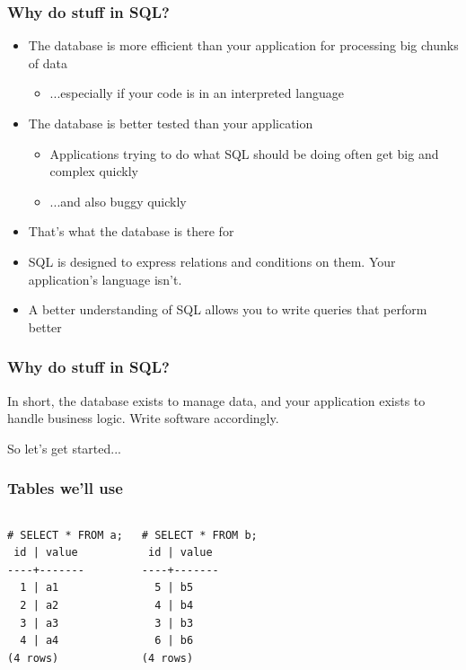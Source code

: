 \documentclass{beamer}
\begin{document}
\begin{frame}
    \frametitle{Why do stuff in SQL?}
    \begin{itemize}
        \item The database is more efficient than your application for processing big chunks of data
        \pause
        \begin{itemize}
            \item ...especially if your code is in an interpreted language
            \pause
        \end{itemize}
        \item The database is better tested than your application
        \pause
        \begin{itemize}
            \item Applications trying to do what SQL should be doing often get big and complex quickly
            \pause
            \item ...and also buggy quickly 
            \pause
        \end{itemize}
        \item That's what the database is there for
        \pause
        \item SQL is designed to express relations and conditions on them. Your application's language isn't.
        \pause
        \item A better understanding of SQL allows you to write queries that perform better
    \end{itemize}
\end{frame}

\begin{frame}
    \frametitle{Why do stuff in SQL?}
    In short, the database exists to manage data, and your application exists to handle business logic. Write software accordingly.
\end{frame}

\begin{frame}
    So let's get started...
\end{frame}

\begin{frame}[fragile]
    \frametitle{Tables we'll use}

   \begin{columns}[l]
       \column{1.5in}
       \begin{verbatim}
# SELECT * FROM a;
 id | value
----+-------
  1 | a1
  2 | a2
  3 | a3
  4 | a4
(4 rows)
       \end{verbatim}
       \column{1.5in}
       \begin{verbatim}
# SELECT * FROM b;
 id | value
----+-------
  5 | b5
  4 | b4
  3 | b3
  6 | b6
(4 rows)
       \end{verbatim}
   \end{columns}
\end{frame}
\end{document}
